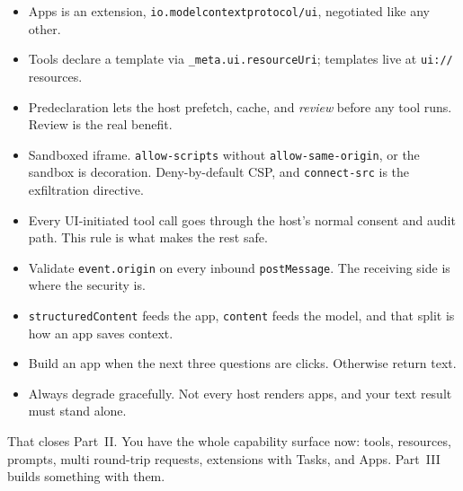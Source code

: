 \begin{itemize}[leftmargin=1.6em, itemsep=3pt]
\item Apps is an extension, \texttt{io.modelcontextprotocol/ui}, negotiated like
any other.
\item Tools declare a template via \texttt{\_meta.ui.resourceUri}; templates live
at \texttt{ui://} resources.
\item Predeclaration lets the host prefetch, cache, and \emph{review} before any
tool runs. Review is the real benefit.
\item Sandboxed iframe. \texttt{allow-scripts} without
\texttt{allow-same-origin}, or the sandbox is decoration. Deny-by-default CSP,
and \texttt{connect-src} is the exfiltration directive.
\item Every UI-initiated tool call goes through the host's normal consent and
audit path. This rule is what makes the rest safe.
\item Validate \texttt{event.origin} on every inbound \texttt{postMessage}. The
receiving side is where the security is. \item \texttt{structuredContent} feeds
the app, \texttt{content} feeds the model, and that split is how an app saves
context.
\item Build an app when the next three questions are clicks. Otherwise return
text.
\item Always degrade gracefully. Not every host renders apps, and your text
result must stand alone.
\end{itemize}

That closes Part~II. You have the whole capability surface now: tools,
resources, prompts, multi round-trip requests, extensions with Tasks, and Apps.
Part~III builds something with them.
